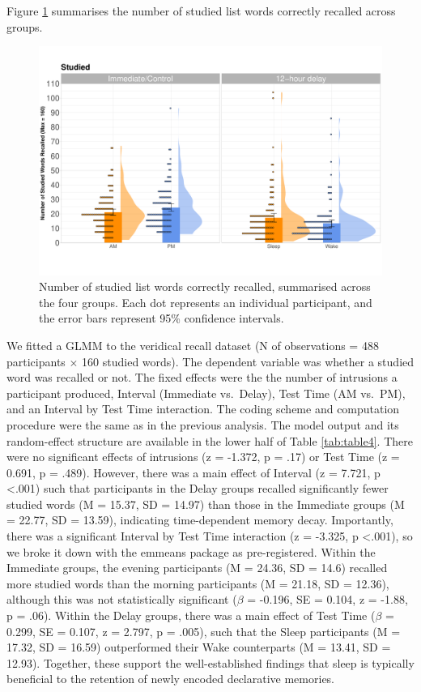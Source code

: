 \documentclass[
]{article}
\begin{document}
Figure \ref{fig:studiedfig} summarises the number of studied list words correctly recalled across groups.

\begin{figure}

{\centering \includegraphics{Figures/studiedgraph} 

}

\caption{Number of studied list words correctly recalled, summarised across the four groups. Each dot represents an individual participant, and the error bars represent 95\% confidence intervals.}\label{fig:studiedfig}
\end{figure}

We fitted a GLMM to the veridical recall dataset (N of observations = 488 participants \(\times\) 160 studied words). The dependent variable was whether a studied word was recalled or not. The fixed effects were the the number of intrusions a participant produced, Interval (Immediate vs.~Delay), Test Time (AM vs.~PM), and an Interval by Test Time interaction. The coding scheme and computation procedure were the same as in the previous analysis. The model output and its random-effect structure are available in the lower half of Table \ref{tab:table4}. There were no significant effects of intrusions (z = -1.372, p = .17) or Test Time (z = 0.691, p = .489). However, there was a main effect of Interval (z = 7.721, p \textless.001) such that participants in the Delay groups recalled significantly fewer studied words (M = 15.37, SD = 14.97) than those in the Immediate groups (M = 22.77, SD = 13.59), indicating time-dependent memory decay. Importantly, there was a significant Interval by Test Time interaction (z = -3.325, p \textless.001), so we broke it down with the emmeans package as pre-registered. Within the Immediate groups, the evening participants (M = 24.36, SD = 14.6) recalled more studied words than the morning participants (M = 21.18, SD = 12.36), although this was not statistically significant (\(\beta\) = -0.196, SE = 0.104, z = -1.88, p = .06). Within the Delay groups, there was a main effect of Test Time (\(\beta\) = 0.299, SE = 0.107, z = 2.797, p = .005), such that the Sleep participants (M = 17.32, SD = 16.59) outperformed their Wake counterparts (M = 13.41, SD = 12.93). Together, these support the well-established findings that sleep is typically beneficial to the retention of newly encoded declarative memories.
\end{document}
